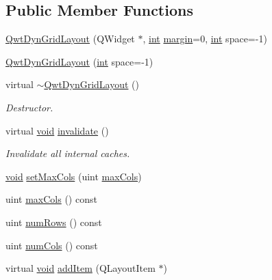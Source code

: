\subsection*{Public Member Functions}
\begin{DoxyCompactItemize}
\item 
\hyperlink{class_qwt_dyn_grid_layout_a2079ddcba8442ef9f386556dd9cb8cc6}{Qwt\-Dyn\-Grid\-Layout} (Q\-Widget $\ast$, \hyperlink{ioapi_8h_a787fa3cf048117ba7123753c1e74fcd6}{int} \hyperlink{fancylineedit_8cpp_a0fa6e789ab8d8c920f2104ee8c183196a9c8c6ada5d0208410d9bb9a14780df36}{margin}=0, \hyperlink{ioapi_8h_a787fa3cf048117ba7123753c1e74fcd6}{int} space=-\/1)
\item 
\hyperlink{class_qwt_dyn_grid_layout_a05d45c0928702e37da3497626b0f7c93}{Qwt\-Dyn\-Grid\-Layout} (\hyperlink{ioapi_8h_a787fa3cf048117ba7123753c1e74fcd6}{int} space=-\/1)
\item 
virtual \hyperlink{class_qwt_dyn_grid_layout_abb583f302fbf5d92b306841d414e52a4}{$\sim$\-Qwt\-Dyn\-Grid\-Layout} ()
\begin{DoxyCompactList}\small\item\em Destructor. \end{DoxyCompactList}\item 
virtual \hyperlink{group___u_a_v_objects_plugin_ga444cf2ff3f0ecbe028adce838d373f5c}{void} \hyperlink{class_qwt_dyn_grid_layout_acb55e24d5bc569c9822110d538e3a82e}{invalidate} ()
\begin{DoxyCompactList}\small\item\em Invalidate all internal caches. \end{DoxyCompactList}\item 
\hyperlink{group___u_a_v_objects_plugin_ga444cf2ff3f0ecbe028adce838d373f5c}{void} \hyperlink{class_qwt_dyn_grid_layout_aedec17be16b997ecd1acff8424e02843}{set\-Max\-Cols} (uint \hyperlink{class_qwt_dyn_grid_layout_a6ffaad457d8c9b4d423c23fb6b433299}{max\-Cols})
\item 
uint \hyperlink{class_qwt_dyn_grid_layout_a6ffaad457d8c9b4d423c23fb6b433299}{max\-Cols} () const 
\item 
uint \hyperlink{class_qwt_dyn_grid_layout_ad3f387078e5e78b66b452c72e99923c2}{num\-Rows} () const 
\item 
uint \hyperlink{class_qwt_dyn_grid_layout_a4678cd0f67c332162c266ac9661b5db6}{num\-Cols} () const 
\item 
virtual \hyperlink{group___u_a_v_objects_plugin_ga444cf2ff3f0ecbe028adce838d373f5c}{void} \hyperlink{class_qwt_dyn_grid_layout_a3ac3ace65c84e16fba7fe83cd795eea1}{add\-Item} (Q\-Layout\-Item $\ast$)

\end{DoxyCompactItemize}
